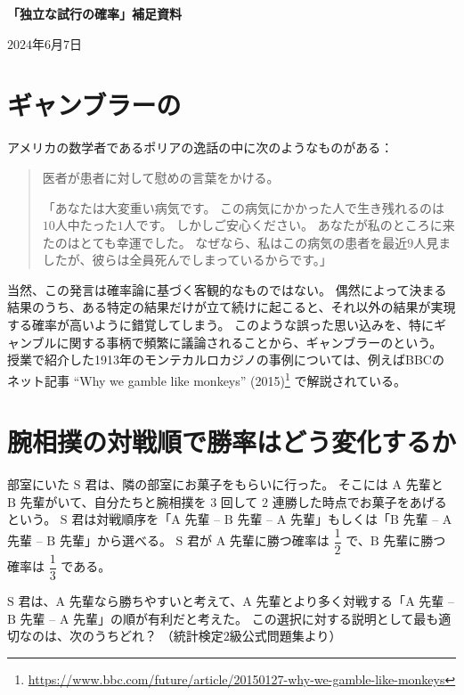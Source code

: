 \documentclass[12pt]{ltjsarticle}
\begin{document}
\pagestyle{empty}

{\LARGE%
\noindent
\textbf{%
「独立な試行の確率」補足資料
}}

\begin{flushleft}
$2024$年$6$月$7$日 \\
\end{flushleft}

\section{ギャンブラーの}

アメリカの数学者であるポリアの逸話の中に次のようなものがある：
\begin{quotation}
  医者が患者に対して慰めの言葉をかける。
  
  「あなたは大変重い病気です。
  この病気にかかった人で生き残れるのは$10$人中たった$1$人です。
  しかしご安心ください。
  あなたが私のところに来たのはとても幸運でした。
  なぜなら、私はこの病気の患者を最近$9$人見ましたが、彼らは全員死んでしまっているからです。」
\end{quotation}
当然、この発言は確率論に基づく客観的なものではない。
偶然によって決まる結果のうち、ある特定の結果だけが立て続けに起こると、それ以外の結果が実現する確率が高いように錯覚してしまう。
このような誤った思い込みを、特にギャンブルに関する事柄で頻繁に議論されることから、ギャンブラーのという。
授業で紹介した1913年のモンテカルロカジノの事例については、例えばBBCのネット記事 ``Why we gamble like monkeys'' (2015)\footnote{%
  \url{https://www.bbc.com/future/article/20150127-why-we-gamble-like-monkeys}
}
で解説されている。

\section{腕相撲の対戦順で勝率はどう変化するか}

部室にいた $\mathrm{S}$ 君は、隣の部室にお菓子をもらいに行った。
そこには $\mathrm{A}$ 先輩と $\mathrm{B}$ 先輩がいて、自分たちと腕相撲を $3$ 回して $2$ 連勝した時点でお菓子をあげるという。
$\mathrm{S}$ 君は対戦順序を「$\mathrm{A}$ 先輩 -- $\mathrm{B}$ 先輩 -- $\mathrm{A}$ 先輩」もしくは「$\mathrm{B}$ 先輩 -- $\mathrm{A}$ 先輩 -- $\mathrm{B}$ 先輩」から選べる。
$\mathrm{S}$ 君が $\mathrm{A}$ 先輩に勝つ確率は $\dfrac{1}{2}$ で、$\mathrm{B}$ 先輩に勝つ確率は $\dfrac{1}{3}$ である。

$\mathrm{S}$ 君は、$\mathrm{A}$ 先輩なら勝ちやすいと考えて、$\mathrm{A}$ 先輩とより多く対戦する「$\mathrm{A}$ 先輩 -- $\mathrm{B}$ 先輩 -- $\mathrm{A}$ 先輩」の順が有利だと考えた。
この選択に対する説明として最も適切なのは、次のうちどれ？
（統計検定$2$級公式問題集より）
\end{document}
